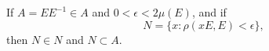 If $A = EE^{-1} \in A$ and $0 < \epsilon < 2\mu(E)$, and if
$$N = \{x : \rho(xE, E) < \epsilon\},$$
then $N \in N$ and $N \subset A$.
